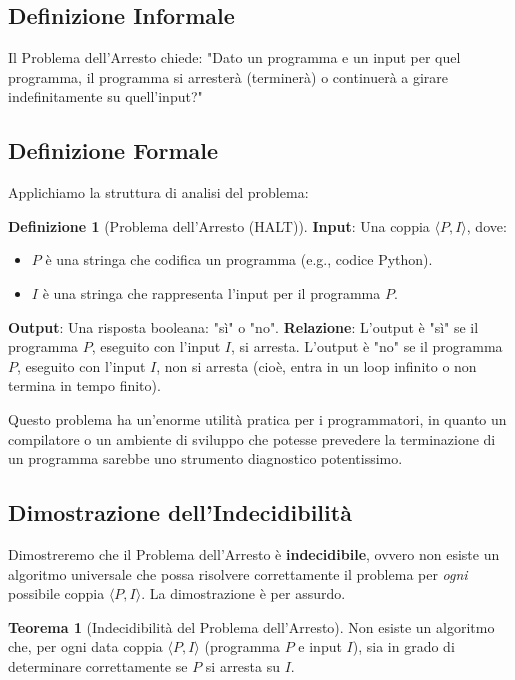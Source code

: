 \documentclass[a4paper]{article}
\theoremstyle{definition} %
\newtheorem{theorem}{Teorema}
\newtheorem{definition}{Definizione}
\begin{document}
\subsection{Definizione Informale}
Il Problema dell'Arresto chiede: "Dato un programma e un input per quel programma, il programma si arresterà (terminerà) o continuerà a girare indefinitamente su quell'input?"

\subsection{Definizione Formale}
Applichiamo la struttura di analisi del problema:

\begin{definition}[Problema dell'Arresto (HALT)]
\textbf{Input}: Una coppia $\langle P, I \rangle$, dove:
\begin{itemize}
    \item $P$ è una stringa che codifica un programma (e.g., codice Python).
    \item $I$ è una stringa che rappresenta l'input per il programma $P$.
\end{itemize}
\textbf{Output}: Una risposta booleana: "sì" o "no".
\textbf{Relazione}: L'output è "sì" se il programma $P$, eseguito con l'input $I$, si arresta. L'output è "no" se il programma $P$, eseguito con l'input $I$, non si arresta (cioè, entra in un loop infinito o non termina in tempo finito).
\end{definition}

Questo problema ha un'enorme utilità pratica per i programmatori, in quanto un compilatore o un ambiente di sviluppo che potesse prevedere la terminazione di un programma sarebbe uno strumento diagnostico potentissimo.

\subsection{Dimostrazione dell'Indecidibilità}
Dimostreremo che il Problema dell'Arresto è \textbf{indecidibile}, ovvero non esiste un algoritmo universale che possa risolvere correttamente il problema per \emph{ogni} possibile coppia $\langle P, I \rangle$. La dimostrazione è per assurdo.

\begin{theorem}[Indecidibilità del Problema dell'Arresto]
Non esiste un algoritmo che, per ogni data coppia $\langle P, I \rangle$ (programma $P$ e input $I$), sia in grado di determinare correttamente se $P$ si arresta su $I$.
\end{theorem}
\end{document}
